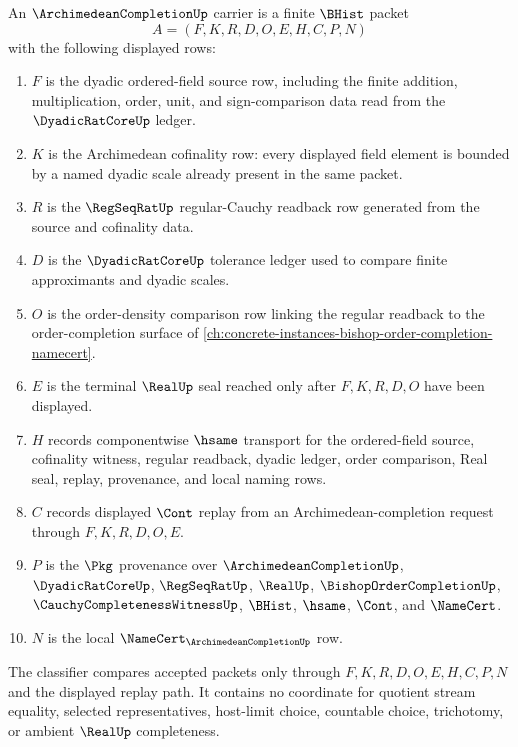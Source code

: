 \begin{definition}
\label{def:archimedean-completion-carrier}
An $\ArchimedeanCompletionUp$ carrier is a finite $\BHist$ packet
$$
A=(F,K,R,D,O,E,H,C,P,N)
$$
with the following displayed rows:
\begin{enumerate}
\item $F$ is the dyadic ordered-field source row, including the finite addition, multiplication, order, unit, and sign-comparison data read from the $\DyadicRatCoreUp$ ledger.
\item $K$ is the Archimedean cofinality row: every displayed field element is bounded by a named dyadic scale already present in the same packet.
\item $R$ is the $\RegSeqRatUp$ regular-Cauchy readback row generated from the source and cofinality data.
\item $D$ is the $\DyadicRatCoreUp$ tolerance ledger used to compare finite approximants and dyadic scales.
\item $O$ is the order-density comparison row linking the regular readback to the order-completion surface of \autoref{ch:concrete-instances-bishop-order-completion-namecert}.
\item $E$ is the terminal $\RealUp$ seal reached only after $F,K,R,D,O$ have been displayed.
\item $H$ records componentwise $\hsame$ transport for the ordered-field source, cofinality witness, regular readback, dyadic ledger, order comparison, Real seal, replay, provenance, and local naming rows.
\item $C$ records displayed $\Cont$ replay from an Archimedean-completion request through $F,K,R,D,O,E$.
\item $P$ is the $\Pkg$ provenance over $\ArchimedeanCompletionUp$, $\DyadicRatCoreUp$, $\RegSeqRatUp$, $\RealUp$, $\BishopOrderCompletionUp$, $\CauchyCompletenessWitnessUp$, $\BHist$, $\hsame$, $\Cont$, and $\NameCert$.
\item $N$ is the local $\NameCert_{\ArchimedeanCompletionUp}$ row.
\end{enumerate}
The classifier compares accepted packets only through $F,K,R,D,O,E,H,C,P,N$ and the displayed replay path. It contains no coordinate for quotient stream equality, selected representatives, host-limit choice, countable choice, trichotomy, or ambient $\RealUp$ completeness.
\end{definition}

